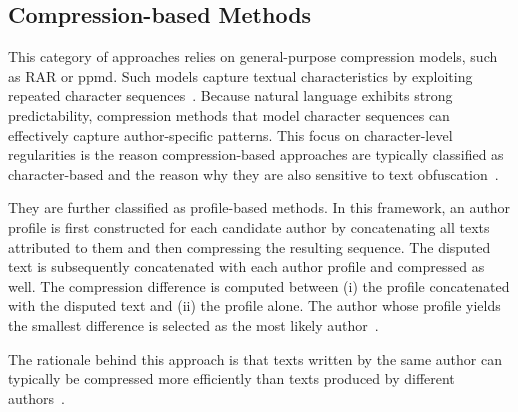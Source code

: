 \subsection{Compression-based Methods}
This category of approaches relies on general-purpose compression models, such as RAR or \ac{ppmd}. %
Such models capture textual characteristics by exploiting repeated character sequences~\citep{stamatatos_survey_2009,neal_surveying_2018}. 
Because natural language exhibits strong predictability, compression methods that model character sequences can effectively capture author-specific patterns.
This focus on character-level regularities is the reason compression-based approaches are typically classified as character-based and the reason why they are also sensitive to text obfuscation~\citep{bevendorff_divergence_based_2020}.

They are further classified as profile-based methods. In this framework, an author profile is first constructed for each candidate author by concatenating all texts attributed to them and then compressing the resulting sequence. 
The disputed text is subsequently concatenated with each author profile and compressed as well. 
The compression difference is computed between (i) the profile concatenated with the disputed text and (ii) the profile alone.  
The author whose profile yields the smallest difference is selected as the most likely author~\citep{stamatatos_survey_2009,elmanarelbouanani_authorship_2014,neal_surveying_2018}.

The rationale behind this approach is that texts written by the same author can typically be compressed more efficiently than texts produced by different authors~\citep{stamatatos_survey_2009,elmanarelbouanani_authorship_2014}.



